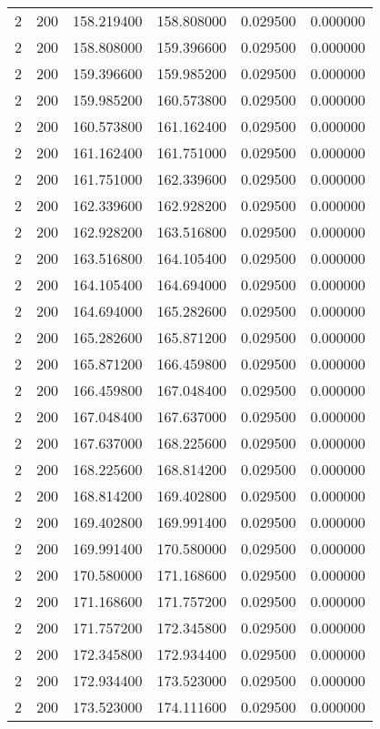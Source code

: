 \begin{longtable}{rrrrrr}
2 & 200 & 158.219400 & 158.808000 & 0.029500 & 0.000000 \\
2 & 200 & 158.808000 & 159.396600 & 0.029500 & 0.000000 \\
2 & 200 & 159.396600 & 159.985200 & 0.029500 & 0.000000 \\
2 & 200 & 159.985200 & 160.573800 & 0.029500 & 0.000000 \\
2 & 200 & 160.573800 & 161.162400 & 0.029500 & 0.000000 \\
2 & 200 & 161.162400 & 161.751000 & 0.029500 & 0.000000 \\
2 & 200 & 161.751000 & 162.339600 & 0.029500 & 0.000000 \\
2 & 200 & 162.339600 & 162.928200 & 0.029500 & 0.000000 \\
2 & 200 & 162.928200 & 163.516800 & 0.029500 & 0.000000 \\
2 & 200 & 163.516800 & 164.105400 & 0.029500 & 0.000000 \\
2 & 200 & 164.105400 & 164.694000 & 0.029500 & 0.000000 \\
2 & 200 & 164.694000 & 165.282600 & 0.029500 & 0.000000 \\
2 & 200 & 165.282600 & 165.871200 & 0.029500 & 0.000000 \\
2 & 200 & 165.871200 & 166.459800 & 0.029500 & 0.000000 \\
2 & 200 & 166.459800 & 167.048400 & 0.029500 & 0.000000 \\
2 & 200 & 167.048400 & 167.637000 & 0.029500 & 0.000000 \\
2 & 200 & 167.637000 & 168.225600 & 0.029500 & 0.000000 \\
2 & 200 & 168.225600 & 168.814200 & 0.029500 & 0.000000 \\
2 & 200 & 168.814200 & 169.402800 & 0.029500 & 0.000000 \\
2 & 200 & 169.402800 & 169.991400 & 0.029500 & 0.000000 \\
2 & 200 & 169.991400 & 170.580000 & 0.029500 & 0.000000 \\
2 & 200 & 170.580000 & 171.168600 & 0.029500 & 0.000000 \\
2 & 200 & 171.168600 & 171.757200 & 0.029500 & 0.000000 \\
2 & 200 & 171.757200 & 172.345800 & 0.029500 & 0.000000 \\
2 & 200 & 172.345800 & 172.934400 & 0.029500 & 0.000000 \\
2 & 200 & 172.934400 & 173.523000 & 0.029500 & 0.000000 \\
2 & 200 & 173.523000 & 174.111600 & 0.029500 & 0.000000 \\

\end{longtable}
